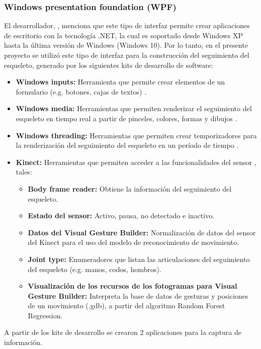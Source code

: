 \subsubsection{Windows presentation foundation (WPF)}
\label{ins:UI:wpf}
El desarrollador, , menciona que este tipo de interfaz permite crear aplicaciones de escritorio con la tecnolog\'ia .NET, la cual es soportado desde Windows XP hasta la \'ultima versi\'on de Windows (Windows 10). Por lo tanto, en el presente proyecto se utiliz\'o este tipo de interfaz para la construcci\'on del seguimiento del esqueleto, generado por los siguientes kits de desarrollo de software:
\begin{itemize}
	\item \textbf{Windows inputs:} Herramienta que permite crear elementos de un formulario (e.g. botones, cajas de textos) \cite{wpfWindows2019}.
	\item \textbf{Windows media:} Herramientas que permiten renderizar el seguimiento del esqueleto en tiempo real a partir de pinceles, colores, formas y dibujos \cite{WindowMedia2019}.
	\item \textbf{Windows threading:} Herramientas que permiten crear temporizadores para la renderizaci\'on del seguimiento del esqueleto en un per\'iodo de tiempo \cite{WindowThreading2019}.
	\item \textbf{Kinect:} Herramientas que permiten acceder a las funcionalidades del sensor \cite{WindowKinect2019}, tales:
	\begin{itemize}
					\item \textbf{Body frame reader:} Obtiene la informaci\'on del seguimiento del esqueleto.
				\item \textbf{Estado del sensor:} Activo, pausa, no detectado e inactivo.
				\item \textbf{Datos del Visual Gesture Builder:} Normalizaci\'on de datos del sensor del Kinect para el uso del modelo de reconocimiento de movimiento.
			\item \textbf{Joint type:} Enumeradores que listan las articulaciones del seguimiento del esqueleto (e.g. manos, codos, hombros).
			\item \textbf{Visualizaci\'on de los recursos de los fotogramas para Visual Gesture Builder:} Interpreta la base de datos de gesturas y posiciones de un movimiento (.gdb), a partir del algoritmo Random Forest Regression.
	\end{itemize}	 
\end{itemize}
A partir de los kits de desarrollo se crearon 2 aplicaciones para la captura de informaci\'on.
